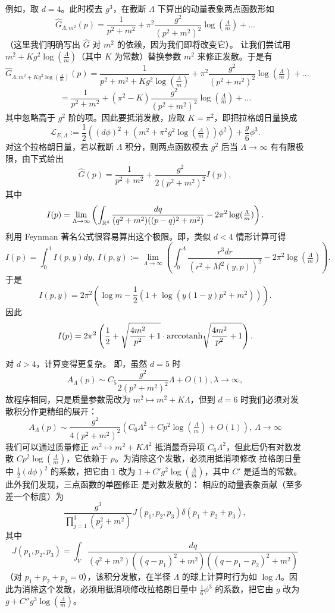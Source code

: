 例如，取 $d=4$。此时模去 $g^3$，在截断 $\Lambda$ 下算出的动量表象两点函数形如
$$
\widehat G_{\Lambda,m^2}(p)=\frac{1}{p^2+m^2}+\pi^2\frac{g^2}{(p^2+m^2)^2}\log(\tfrac{\Lambda}{m})+...
$$
（这里我们明确写出 $\widehat G$ 对 $m^2$ 的依赖，因为我们即将改变它）。
让我们尝试用 $m^2+Kg^2\log(\tfrac{\Lambda}{m})$（其中 $K$ 为常数）替换参数 $m^2$ 来修正发散。于是有
$$
\widehat G_{\Lambda,m^2+Kg^2\log(\tfrac{\Lambda}{m})}(p)=\frac{1}{p^2+m^2+Kg^2\log(\tfrac{\Lambda}{m})}+\pi^2\frac{g^2}{(p^2+m^2)^2}\log(\tfrac{\Lambda}{m})+...
$$
$$
=\frac{1}{p^2+m^2}+(\pi^2-K)\frac{g^2}{(p^2+m^2)^2}\log(\tfrac{\Lambda}{m})+...
$$
其中忽略高于 $g^2$ 阶的项。因此要抵消发散，应取
$K=\pi^2$，即把拉格朗日量换成
$$
\mathcal L_{E,\Lambda}:=\frac{1}{2}((d\phi)^2+(m^2+\pi^2g^2\log(\tfrac{\Lambda}{m}))\phi^2)+\frac{g}{6}\phi^3.
$$
对这个拉格朗日量，若以截断 $\Lambda$ 积分，则两点函数模去 $g^2$ 后当
$\Lambda\to \infty$ 有有限极限，由下式给出
$$
\widehat G(p)=\frac{1}{p^2+m^2}+\frac{g^2}{2(p^2+m^2)^2}I(p),
$$
其中
$$
I(p)=\lim_{\Lambda\to \infty} \left(\int_{\Bbb R^4} \frac{dq}{(q^2+m^2)((p-q)^2+m^2)}-2\pi^2\log(\tfrac{\Lambda}{m})\right).
$$
利用 Feynman 著名公式很容易算出这个极限。即，类似 $d<4$ 情形计算可得
$$
I(p)=\int_0^1 I(p,y)dy,\ I(p,y):=\lim_{\Lambda\to \infty} \left(\int_0^\Lambda \frac{r^3dr}{(r^2+M^2(y,p))^2}-2\pi^2\log (\tfrac{\Lambda}{m})\right).
$$
于是
$$
I(p,y)=2\pi^2(\log m-\frac{1}{2}(1+\log(y(1-y)p^2+m^2))).
$$
因此
$$
I(p)=2\pi^2\left(\frac{1}{2}+\sqrt{\frac{4 m^2}{p^2} + 1}\cdot {\rm arccotanh}\sqrt{\frac{4 m^2}{p^2} + 1}\right).
$$

对 $d>4$，计算变得更复杂。
即，虽然 $d=5$ 时
$$
A_\Lambda(p)\sim C_5\frac{g^2}{2(p^2+m^2)^2}\Lambda+O(1), \lambda\to \infty,
$$
故程序相同，只是质量参数需改为
$m^2\mapsto m^2+K\Lambda$，但到 $d=6$ 时我们必须对发散积分作更精细的展开：
$$
A_\Lambda(p)\sim \frac{g^2}{4(p^2+m^2)^2}(C_6\Lambda^2+Cp^2\log(\tfrac{\Lambda}{m})+O(1)),\ \Lambda\to \infty
$$
我们可以通过质量修正
$m^2\mapsto m^2+K\Lambda^2$ 抵消最奇异项 $C_6\Lambda^2$，但此后仍有对数发散
$Cp^2\log(\tfrac{\Lambda}{m})$，它依赖于 $p$。为消除这个发散，必须用抵消项修改
拉格朗日量中 $\frac{1}{2}(d\phi)^2$ 的系数，把它由 $1$
改为 $1+C'g^2\log(\tfrac{\Lambda}{m})$，其中 $C'$ 是适当的常数。此外我们发现，三点函数的单圈修正
是对数发散的：
相应的动量表象贡献（至多差一个标度）为
$$
\frac{g^3}{\prod_{j=1}^3(p_j^2+m^2)}J(p_1,p_2,p_3)\delta(p_1+p_2+p_3),
$$
其中
$$
J(p_1,p_2,p_3)=\int_V \frac{dq}{(q^2+m^2)((q-p_1)^2+m^2)((q-p_1-p_2)^2+m^2)}
$$
（对 $p_1+p_2+p_3=0$），该积分发散，在半径
$\Lambda$ 的球上计算时行为如 $\log \Lambda$。因此为消除这个发散，必须用抵消项修改拉格朗日量中 $\frac{1}{6}\phi^3$
的系数，把它由 $g$ 改为 $g+C''g^3\log(\tfrac{\Lambda}{m})$。

